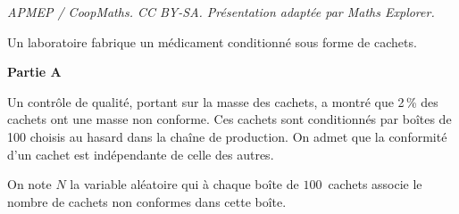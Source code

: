 \documentclass[10pt]{article}
\begin{document}
\noindent\textit{APMEP / CoopMaths. CC BY-SA. Présentation adaptée par Maths Explorer.}\par\medskip
\smallskip

Un laboratoire fabrique un médicament conditionné sous forme de cachets.

\begin{center}
\textbf{Partie A}
\end{center}

Un contrôle de qualité, portant sur la masse des cachets, a montré que 2\,\% des cachets ont une masse non conforme. Ces cachets sont conditionnés par boîtes de 100 choisis au hasard dans la chaîne de production. On admet que la conformité d'un cachet est indépendante de celle des autres.



On note $N$ la variable aléatoire qui à chaque boîte de $100$~cachets associe le nombre de cachets non conformes dans cette boîte.
\end{document}

